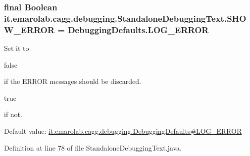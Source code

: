 \hypertarget{classit_1_1emarolab_1_1cagg_1_1debugging_1_1StandaloneDebuggingText_a25b2f13f846a13ea2f8ec233645cec10}{
\subsubsection[{S\-H\-O\-W\-\_\-\-E\-R\-R\-O\-R}]{\setlength{\rightskip}{0pt plus 5cm}final Boolean it.\-emarolab.\-cagg.\-debugging.\-Standalone\-Debugging\-Text.\-S\-H\-O\-W\-\_\-\-E\-R\-R\-O\-R = {\bf Debugging\-Defaults.\-L\-O\-G\-\_\-\-E\-R\-R\-O\-R}\hspace{0.3cm}{\ttfamily [static]}}}\label{classit_1_1emarolab_1_1cagg_1_1debugging_1_1StandaloneDebuggingText_a25b2f13f846a13ea2f8ec233645cec10}
Set it to
\begin{DoxyCode}
\textcolor{keyword}{false} 
\end{DoxyCode}
 if the E\-R\-R\-O\-R messages should be discarded.
\begin{DoxyCode}
\textcolor{keyword}{true} 
\end{DoxyCode}
 if not. \par
 Default value\-: \hyperlink{classit_1_1emarolab_1_1cagg_1_1debugging_1_1DebuggingDefaults_acd5d57de60e84e4807ede35008bb3d6c}{it.\-emarolab.\-cagg.\-debugging.\-Debugging\-Defaults\#\-L\-O\-G\-\_\-\-E\-R\-R\-O\-R} 

Definition at line 78 of file Standalone\-Debugging\-Text.\-java.

